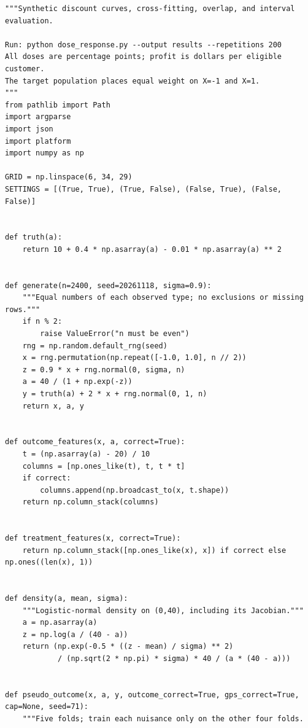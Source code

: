 \begin{Verbatim}[breaklines,breakanywhere,fontsize=\small]
"""Synthetic discount curves, cross-fitting, overlap, and interval evaluation.

Run: python dose_response.py --output results --repetitions 200
All doses are percentage points; profit is dollars per eligible customer.
The target population places equal weight on X=-1 and X=1.
"""
from pathlib import Path
import argparse
import json
import platform
import numpy as np

GRID = np.linspace(6, 34, 29)
SETTINGS = [(True, True), (True, False), (False, True), (False, False)]


def truth(a):
    return 10 + 0.4 * np.asarray(a) - 0.01 * np.asarray(a) ** 2


def generate(n=2400, seed=20261118, sigma=0.9):
    """Equal numbers of each observed type; no exclusions or missing rows."""
    if n % 2:
        raise ValueError("n must be even")
    rng = np.random.default_rng(seed)
    x = rng.permutation(np.repeat([-1.0, 1.0], n // 2))
    z = 0.9 * x + rng.normal(0, sigma, n)
    a = 40 / (1 + np.exp(-z))
    y = truth(a) + 2 * x + rng.normal(0, 1, n)
    return x, a, y


def outcome_features(x, a, correct=True):
    t = (np.asarray(a) - 20) / 10
    columns = [np.ones_like(t), t, t * t]
    if correct:
        columns.append(np.broadcast_to(x, t.shape))
    return np.column_stack(columns)


def treatment_features(x, correct=True):
    return np.column_stack([np.ones_like(x), x]) if correct else np.ones((len(x), 1))


def density(a, mean, sigma):
    """Logistic-normal density on (0,40), including its Jacobian."""
    a = np.asarray(a)
    z = np.log(a / (40 - a))
    return (np.exp(-0.5 * ((z - mean) / sigma) ** 2)
            / (np.sqrt(2 * np.pi) * sigma) * 40 / (a * (40 - a)))


def pseudo_outcome(x, a, y, outcome_correct=True, gps_correct=True, cap=None, seed=71):
    """Five folds; train each nuisance only on the other four folds.


\end{Verbatim}
